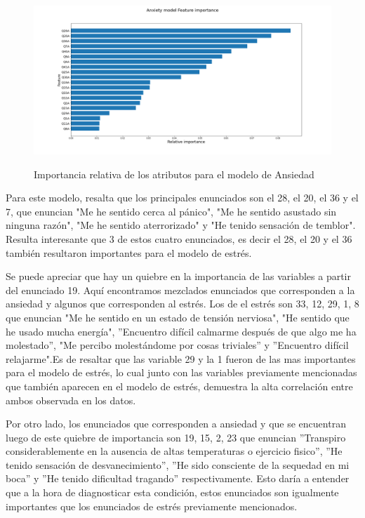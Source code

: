 \begin{figure}[h]
\caption{Importancia relativa de los atributos para el modelo de Ansiedad}
\centering
\includegraphics[width=\textwidth,height=\textheight,keepaspectratio]{Media/Pictures/Anxiety model Feature importance.png} 
\label{variables_ansiedad}
\end{figure}

Para este modelo, resalta que los principales enunciados son el 28, el 20, el 36 y el 7, que enuncian "Me he sentido cerca al pánico", "Me he sentido asustado sin ninguna razón", "Me he sentido aterrorizado" y "He tenido sensación de temblor". Resulta interesante que 3 de estos cuatro enunciados, es decir el 28, el 20 y el 36 también resultaron importantes para el modelo de estrés.

 \medbreak
 
Se puede apreciar que hay un quiebre en la importancia de las variables a partir del enunciado 19. Aquí encontramos mezclados enunciados que corresponden a la ansiedad y algunos que corresponden al estrés. Los de el estrés son  33, 12,  29, 1, 8 que enuncian "Me he sentido en un estado de tensión nerviosa", "He sentido que he usado mucha energía", ''Encuentro difícil calmarme después de que algo me ha molestado'', "Me percibo molestándome por cosas triviales'' y ''Encuentro difícil relajarme".Es de resaltar que las variable 29 y la 1 fueron de las mas importantes para el modelo de estrés, lo cual junto con las variables previamente mencionadas que también aparecen en el modelo de estrés, demuestra la alta correlación entre ambos observada en los datos.
 
Por otro lado, los enunciados que corresponden a ansiedad y que se encuentran luego de este quiebre de importancia son 19, 15, 2, 23 que enuncian ''Transpiro considerablemente  en la ausencia de altas temperaturas o ejercicio fisico'', ''He tenido sensación de desvanecimiento'', ''He sido consciente de la sequedad en mi boca'' y ''He tenido dificultad tragando'' respectivamente. Esto daría a entender que a la hora de diagnosticar esta condición, estos enunciados son igualmente importantes que los enunciados de estrés previamente mencionados.

